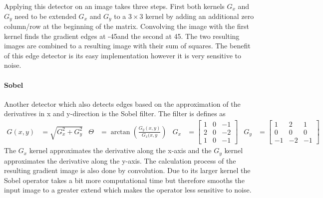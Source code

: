 Applying this detector on an image takes three steps. First both kernels $G_x$ and $G_y$  need to be extended $G_x$ and $G_y$ to a $3\times3$ kernel by adding an additional zero column/row at the beginning of the matrix. Convolving the image with the first kernel finds the gradient edges at -45\textdegree  and the second at 45\textdegree. The two resulting images are combined to a resulting image with their sum of squares. The benefit of this edge detector is its easy implementation however it is very sensitive to noise\cite{Davis1975a}.
\paragraph{Sobel}
Another detector which also detects edges based on the approximation of the derivatives in x and y-direction is the Sobel filter\cite{Sobel1990}. The filter is defines as 
\begin{align}
G(x,y) &= \sqrt{G_x^2 + G_y^2}  &
\Theta &= \arctan{(\frac{G_y(x,y)}{G_x(x,y})} &
G_x &= \begin{bmatrix} 1  & 0 & -1 \\ 2 & 0 & -2 \\ 1  & 0 & -1 \end{bmatrix} &
G_y &= \begin{bmatrix} 1  & 2 & 1 \\ 0 & 0 & 0 \\ -1  & -2 & -1 \end{bmatrix} &
\end{align} 
The $G_x$ kernel approximates the derivative along the x-axis and the $G_y$ kernel approximates the derivative along the y-axis. The calculation process of the resulting gradient image is also done by convolution. Due to its larger kernel the Sobel operator takes a bit more computational time but therefore smooths the input image to a greater extend which makes the operator less sensitive to noise. 
